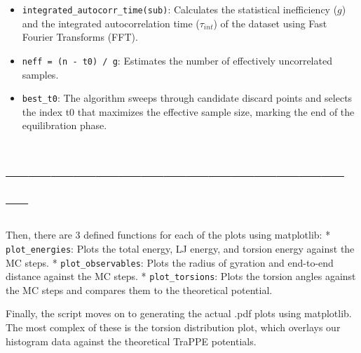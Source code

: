 \begin{itemize}
\tightlist
\item
  \texttt{integrated\_autocorr\_time(sub)}: Calculates the statistical
  inefficiency (\(g\)) and the integrated autocorrelation time
  (\(\tau_{int}\)) of the dataset using Fast Fourier Transforms (FFT).
\item
  \texttt{neff\ =\ (n\ -\ t0)\ /\ g}: Estimates the number of
  effectively uncorrelated samples.
\item
  \texttt{best\_t0}: The algorithm sweeps through candidate discard
  points and selects the index t0 that maximizes the effective sample
  size, marking the end of the equilibration phase.
\end{itemize}

\section{------------------------------------------------}\label{section}

Then, there are 3 defined functions for each of the plots using
matplotlib: * \texttt{plot\_energies}: Plots the total energy, LJ
energy, and torsion energy against the MC steps. *
\texttt{plot\_observables}: Plots the radius of gyration and end-to-end
distance against the MC steps. * \texttt{plot\_torsions}: Plots the
torsion angles against the MC steps and compares them to the theoretical
potential.

Finally, the script moves on to generating the actual .pdf plots using
matplotlib. The most complex of these is the torsion distribution plot,
which overlays our histogram data against the theoretical TraPPE
potentials.

\begin{Shaded}
\begin{Highlighting}[]
\OperatorTok{=}\NormalTok{):}
     
\OperatorTok{=} \NormalTok{, }\OperatorTok{{-}}\NormalTok{, }
    \NormalTok{:}
\OperatorTok{=} \NormalTok{, }\OperatorTok{{-}}\NormalTok{, }
        \OperatorTok{*}\NormalTok{ (} \OperatorTok{+}
              \OperatorTok{+}\OperatorTok{*}\NormalTok{ (} \OperatorTok{{-}} \OperatorTok{*}
              \OperatorTok{+}\OperatorTok{*}\NormalTok{ (} \OperatorTok{+} \OperatorTok{*}
\end{Highlighting}
\end{Shaded}

